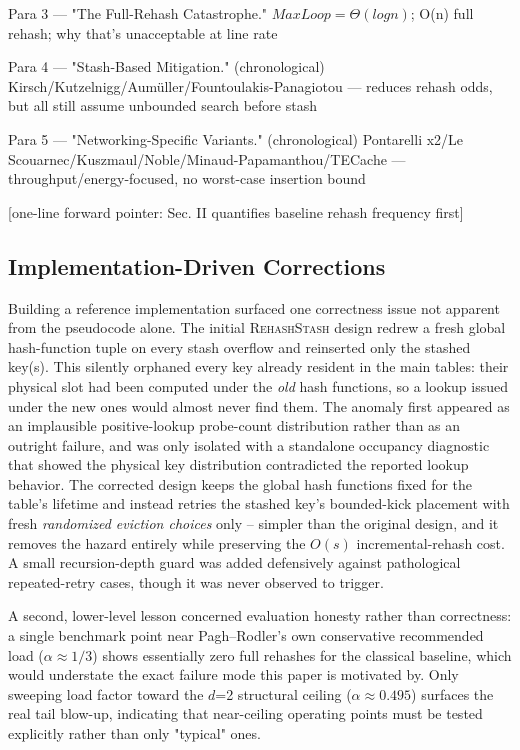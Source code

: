 \documentclass[conference]{IEEEtran}
\let\oldtextsc\textsc
\renewcommand{\textsc}[1]{\textup{\oldtextsc{#1}}}
\begin{document}
	Para 3 — "The Full-Rehash Catastrophe."
	$MaxLoop = \Theta(log n)$; O(n) full rehash; why that's unacceptable at line rate
	
	Para 4 — "Stash-Based Mitigation." (chronological)
	Kirsch/Kutzelnigg/Aumüller/Fountoulakis-Panagiotou — reduces rehash odds,
	but all still assume unbounded search before stash
	
	Para 5 — "Networking-Specific Variants." (chronological)
	Pontarelli x2/Le Scouarnec/Kuszmaul/Noble/Minaud-Papamanthou/TECache —
	throughput/energy-focused, no worst-case insertion bound
	
	[one-line forward pointer: Sec. II quantifies baseline rehash frequency first]
	
	\subsection{Implementation-Driven Corrections}
	Building a reference implementation surfaced one correctness issue not
	apparent from the pseudocode alone. The initial \textsc{RehashStash}
	design redrew a fresh global hash-function tuple on every stash
	overflow and reinserted only the stashed key(s). This silently orphaned
	every key already resident in the main tables: their physical slot had
	been computed under the \emph{old} hash functions, so a lookup issued
	under the new ones would almost never find them. The anomaly first
	appeared as an implausible positive-lookup probe-count distribution
	rather than as an outright failure, and was only isolated with a
	standalone occupancy diagnostic that showed the physical key
	distribution contradicted the reported lookup behavior. The corrected
	design keeps the global hash functions fixed for the table's lifetime
	and instead retries the stashed key's bounded-kick placement with
	fresh \emph{randomized eviction choices} only -- simpler than the
	original design, and it removes the hazard entirely while preserving
	the $O(s)$ incremental-rehash cost. A small recursion-depth guard was
	added defensively against pathological repeated-retry cases, though it
	was never observed to trigger.
	
	A second, lower-level lesson concerned evaluation honesty rather than
	correctness: a single benchmark point near Pagh--Rodler's own
	conservative recommended load ($\alpha\!\approx\!1/3$) shows
	essentially zero full rehashes for the classical baseline, which would
	understate the exact failure mode this paper is motivated by. Only
	sweeping load factor toward the $d$=2 structural ceiling
	($\alpha\!\approx\!0.495$) surfaces the real tail blow-up, indicating
	that near-ceiling operating points must be tested explicitly rather
	than only "typical" ones.
	
\end{document}
